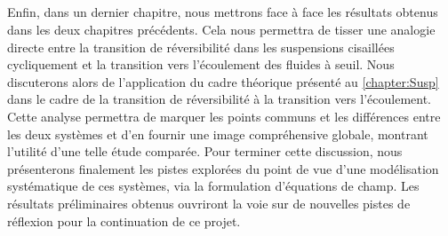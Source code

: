 \subparagraph{}Enfin, dans un dernier chapitre, nous mettrons face à face les résultats obtenus dans les deux chapitres précédents. Cela nous permettra de tisser une analogie directe entre la transition de réversibilité dans les suspensions cisaillées cycliquement et la transition vers l'écoulement des fluides à seuil. Nous discuterons alors de l'application du cadre théorique présenté au \autoref{chapter:Susp} dans le cadre de la transition de réversibilité à la transition vers l'écoulement. Cette analyse permettra de marquer les points communs et les différences entre les deux systèmes et d'en fournir une image compréhensive globale, montrant l'utilité d'une telle étude comparée. Pour terminer cette discussion, nous présenterons finalement les pistes explorées du point de vue d'une modélisation systématique de ces systèmes, via la formulation d'équations de champ. Les résultats préliminaires obtenus ouvriront la voie sur de nouvelles pistes de réflexion pour la continuation de ce projet.